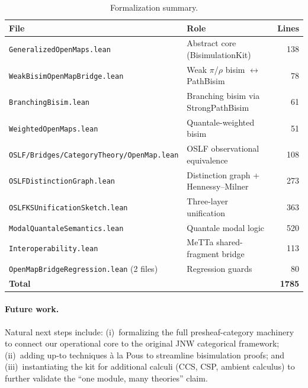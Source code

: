 \documentclass[11pt]{article}
\begin{document}
\begin{table}[t]
\centering
\caption{Formalization summary.}\label{tab:files}
\begin{tabular}{@{}llr@{}}
\toprule
\textbf{File} & \textbf{Role} & \textbf{Lines} \\
\midrule
\texttt{GeneralizedOpenMaps.lean} & Abstract core (BisimulationKit) & 138 \\
\texttt{WeakBisimOpenMapBridge.lean} & Weak $\pi$/$\rho$ bisim $\leftrightarrow$ PathBisim & 78 \\
\texttt{BranchingBisim.lean} & Branching bisim via StrongPathBisim & 61 \\
\texttt{WeightedOpenMaps.lean} & Quantale-weighted bisim & 51 \\
\texttt{OSLF/Bridges/CategoryTheory/OpenMap.lean} & OSLF observational equivalence & 108 \\
\texttt{OSLFDistinctionGraph.lean} & Distinction graph + Hennessy--Milner & 273 \\
\texttt{OSLFKSUnificationSketch.lean} & Three-layer unification & 363 \\
\texttt{ModalQuantaleSemantics.lean} & Quantale modal logic & 520 \\
\texttt{Interoperability.lean} & MeTTa shared-fragment bridge & 113 \\
\texttt{OpenMapBridgeRegression.lean} (2 files) & Regression guards & 80 \\
\midrule
\textbf{Total} & & \textbf{1785} \\
\bottomrule
\end{tabular}
\end{table}

\paragraph{Future work.}
Natural next steps include: (i)~formalizing the full presheaf-category
machinery to connect our operational core to the original JNW categorical
framework; (ii)~adding up-to techniques \`{a} la Pous to streamline
bisimulation proofs; and (iii)~instantiating the kit for additional
calculi (CCS, CSP, ambient calculus) to further validate the
``one module, many theories'' claim.



\end{document}

